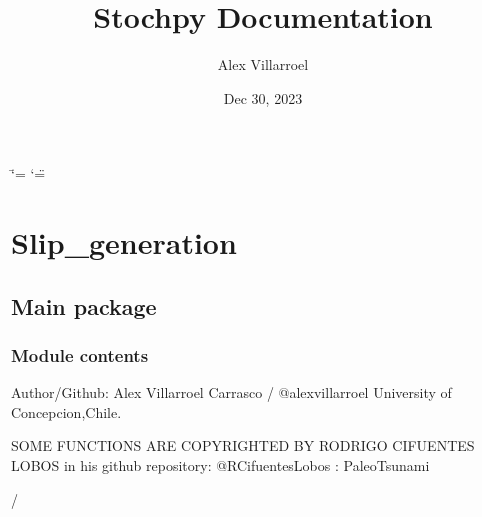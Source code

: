 \documentclass[letterpaper,10pt,english]{sphinxmanual}
\title{Stochpy Documentation}
\date{Dec 30, 2023}
\author{Alex Villarroel}
\begin{document}
\ifdefined\shorthandoff
  \ifnum\catcode`\=\string=\active\shorthandoff{=}\fi
  \ifnum\catcode`\"=\active{}\fi
\fi

\pagestyle{empty}
\sphinxmaketitle
\pagestyle{plain}
\sphinxtableofcontents
\pagestyle{normal}
\label{\detokenize{index::doc}}


\sphinxstepscope


\chapter{Slip\_generation}
\label{\detokenize{modules:slip-generation}}\label{\detokenize{modules::doc}}
\sphinxstepscope


\section{Main package}
\label{\detokenize{main:main-package}}\label{\detokenize{main::doc}}

\subsection{Module contents}
\label{\detokenize{main:module-main}}\label{\detokenize{main:module-contents}}\begin{description}
\sphinxAtStartPar
Author/Github: Alex Villarroel Carrasco / @alexvillarroel
University of Concepcion,Chile.

\sphinxAtStartPar
SOME FUNCTIONS ARE COPYRIGHTED BY RODRIGO CIFUENTES LOBOS
in his github repository: @RCifuentesLobos : PaleoTsunami

\sphinxAtStartPar
/

\end{description}

\begin{fulllineitems}
\label{\detokenize{main:main.Mw_kauselramirez}}
\pysigstartsignatures
{}
\pysigstopsignatures
\end{fulllineitems}

\end{document}
